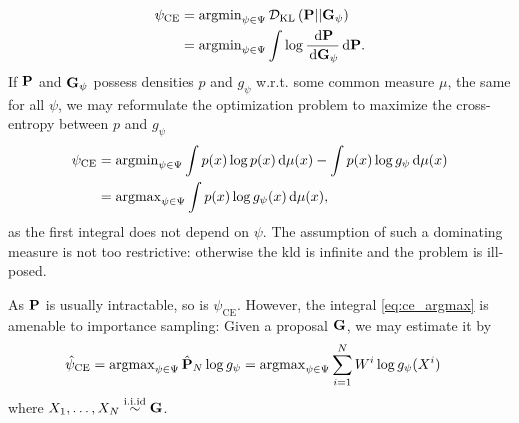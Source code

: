 \begin{align*}
    \psi_{\text{CE}} &= \argmin_{\psi \in \Psi} \Dkl{\P}{\G_{\psi}} \\
    &= \argmin_{\psi \in \Psi} \int \log \frac{\d \P}{\d\G_{\psi}} \d \P.
\end{align*}
If $\P$ and $\G_{\psi}$ possess densities $p$ and $g_{\psi}$ w.r.t. some common measure $\mu$, the same for all $\psi$, we may reformulate the optimization problem to maximize the cross-entropy between $p$ and $g_{\psi}$
\begin{align}
    \psi_{\text{CE}} &= \argmin_{\psi \in \Psi} \int  p(x)\log p(x) \d \mu(x) - \int p(x)\log g_{\psi} \d \mu(x) \nonumber\\ 
    &= \argmax_{\psi \in \Psi} \int p(x) \log g_{\psi}(x) \d \mu(x), \label{eq:ce_argmax}
\end{align}
as the first integral does not depend on $\psi$. The assumption of such a dominating measure is not too restrictive: otherwise the \gls{kld} is infinite and the problem is ill-posed.

As $\P$ is usually intractable, so is $\psi_{\text{CE}}$. However, the integral \cref{eq:ce_argmax} is amenable to importance sampling: Given a proposal $\G$, we may estimate it by
\begin{align}
\hat\psi_{\text{CE}} &= \argmax_{\psi \in \Psi} \hat \P_{N} \log g_{\psi} = \argmax_{\psi\in\Psi} \sum_{i = 1}^{N}W^{i}\log g_{\psi}(X^{i}) \label{eq:ce-M-estimator}
\end{align}
where $X_1, \dots, X_N \iid \G$. 
%
%
%
%
%    

